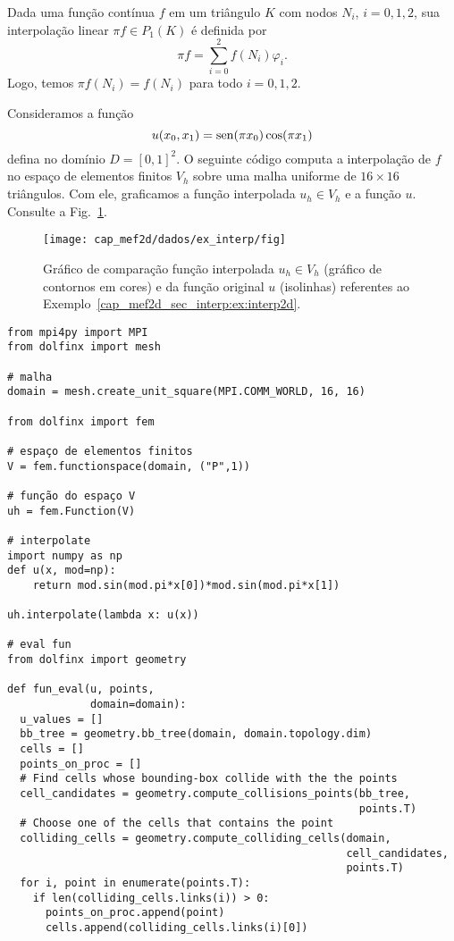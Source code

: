 Dada uma função contínua $f$ em um triângulo $K$ com nodos $N_i$, $i=0, 1, 2$, sua interpolação linear $\pi f \in P_1(K)$ é definida por
\begin{equation}
  \pi f = \sum_{i=0}^2 f(N_i)\varphi_i.
\end{equation}
Logo, temos $\pi f(N_i) = f(N_i)$ para todo $i=0, 1, 2$.

\begin{ex}\label{cap_mef2d_sec_interp:ex:interp2d}
  Consideramos a função
  \begin{equation}
    u(x_0, x_1) = \operatorname{sen}(\pi x_0)\cos(\pi x_1)
  \end{equation}
  defina no domínio $D = [0,1]^2$. O seguinte código computa a interpolação de $f$ no espaço de elementos finitos $V_h$ sobre uma malha uniforme de $16\times 16$ triângulos. Com ele, graficamos a função interpolada $u_h\in V_h$ e a função $u$. Consulte a Fig.~\ref{cap_mef2d_sec_interp:fig:interp2d}.

  \begin{figure}
    \centering
    \texttt{[image: cap\_mef2d/dados/ex\_interp/fig]}
    \caption{Gráfico de comparação função interpolada $u_h\in V_h$ (gráfico de contornos em cores) e da função original $u$ (isolinhas) referentes ao Exemplo~\ref{cap_mef2d_sec_interp:ex:interp2d}.}
    \label{cap_mef2d_sec_interp:fig:interp2d}
  \end{figure}

\begin{lstlisting}[caption=interp2d.py, label=cap_mef2d_sec_interp:cod:interp2d]
from mpi4py import MPI
from dolfinx import mesh

# malha
domain = mesh.create_unit_square(MPI.COMM_WORLD, 16, 16)

from dolfinx import fem

# espaço de elementos finitos
V = fem.functionspace(domain, ("P",1))

# função do espaço V
uh = fem.Function(V)

# interpolate
import numpy as np
def u(x, mod=np):
    return mod.sin(mod.pi*x[0])*mod.sin(mod.pi*x[1])

uh.interpolate(lambda x: u(x))

# eval fun
from dolfinx import geometry

def fun_eval(u, points,
             domain=domain):
  u_values = []
  bb_tree = geometry.bb_tree(domain, domain.topology.dim)
  cells = []
  points_on_proc = []
  # Find cells whose bounding-box collide with the the points
  cell_candidates = geometry.compute_collisions_points(bb_tree, 
                                                       points.T)
  # Choose one of the cells that contains the point
  colliding_cells = geometry.compute_colliding_cells(domain, 
                                                     cell_candidates, 
                                                     points.T)
  for i, point in enumerate(points.T):
    if len(colliding_cells.links(i)) > 0:
      points_on_proc.append(point)
      cells.append(colliding_cells.links(i)[0])


\end{lstlisting}
\end{ex}
